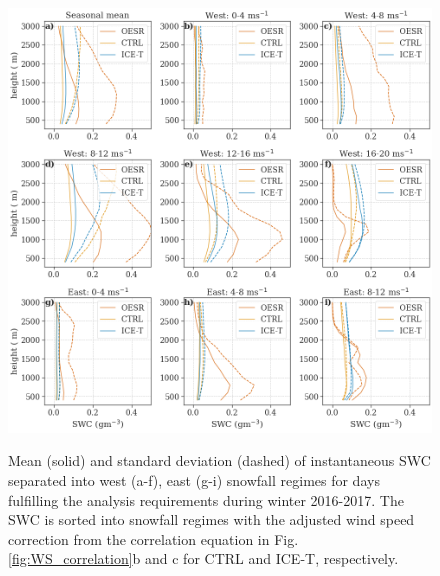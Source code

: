 \documentclass{ametsocV5}
\begin{document}
\begin{figure}
	\noindent\includegraphics[width=\textwidth,angle=0]{fig9.png}\\
	\caption{Mean (solid) and standard deviation (dashed) of instantaneous SWC separated into west (a-f), east (g-i) snowfall regimes for days fulfilling the analysis requirements during winter 2016-2017. The SWC is sorted into snowfall regimes with the adjusted wind speed correction from the correlation equation in Fig. \ref{fig:WS_correlation}b and c for CTRL and ICE-T, respectively.
	}
	\label{fig:vert_swc}
\end{figure}
\end{document}
